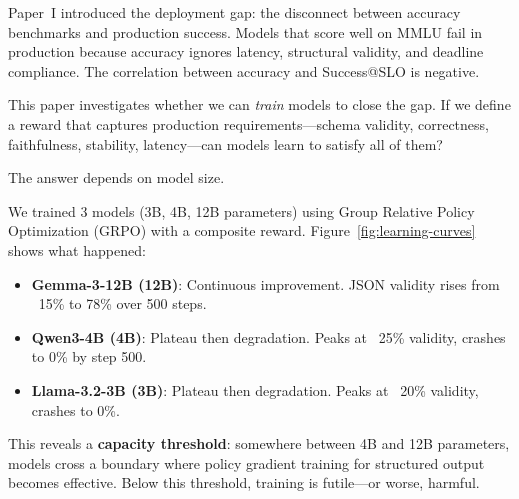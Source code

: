 \documentclass[11pt]{article}
\begin{document}
Paper~I introduced the deployment gap: the disconnect between accuracy benchmarks and production success.
Models that score well on MMLU fail in production because accuracy ignores latency, structural validity, and deadline compliance.
The correlation between accuracy and Success@SLO is negative.

This paper investigates whether we can \emph{train} models to close the gap.
If we define a reward that captures production requirements---schema validity, correctness, faithfulness, stability, latency---can models learn to satisfy all of them?

The answer depends on model size.

We trained 3 models (3B, 4B, 12B parameters) using Group Relative Policy Optimization (GRPO) with a composite reward.
Figure~\ref{fig:learning-curves} shows what happened:
\begin{itemize}[leftmargin=12pt]
    \item \textbf{Gemma-3-12B (12B)}: Continuous improvement. JSON validity rises from ~15\% to 78\% over 500 steps.
    \item \textbf{Qwen3-4B (4B)}: Plateau then degradation. Peaks at ~25\% validity, crashes to 0\% by step 500.
    \item \textbf{Llama-3.2-3B (3B)}: Plateau then degradation. Peaks at ~20\% validity, crashes to 0\%.
\end{itemize}

This reveals a \textbf{capacity threshold}: somewhere between 4B and 12B parameters, models cross a boundary where policy gradient training for structured output becomes effective.
Below this threshold, training is futile---or worse, harmful.
\end{document}
